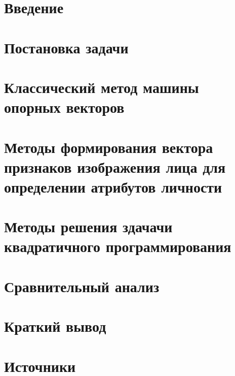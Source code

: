 \documentclass[main.tex]{subfiles}
\begin{document}
\section{Введение}

\section{Постановка задачи}


\section{Классический метод машины опорных векторов}

\section{Методы формирования вектора признаков изображения лица для определении атрибутов личности}

\section{Методы решения здачачи квадратичного программирования}

\section{Сравнительный анализ}

\section{Краткий вывод}

\newpage
\section{Источники}

\end{document}
